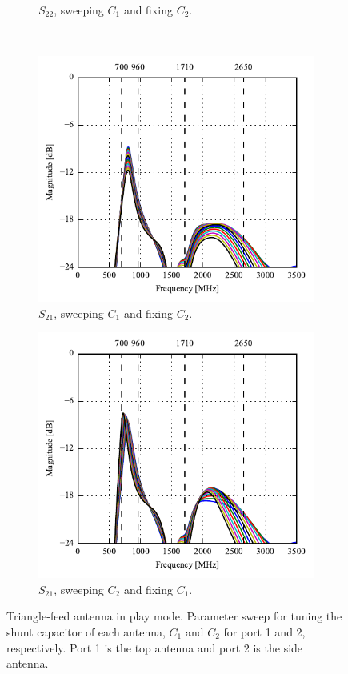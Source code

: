 \begin{figure}[htbp]
\begin{subfigure}[b]{0.49\linewidth}
        \caption{$S_{22}$, sweeping $C_1$ and fixing $C_2$.}
    \end{subfigure}
    \\
    \begin{subfigure}[b]{0.49\linewidth}
        \centering
        \includegraphics{img/tech_sol/trianglefeed/play_mode/Csh1s21.pdf}
        \caption{$S_{21}$, sweeping $C_1$ and fixing $C_2$.}
    \end{subfigure}
    \hfill
    \begin{subfigure}[b]{0.49\linewidth}
        \centering
        \includegraphics{img/tech_sol/trianglefeed/play_mode/Csh2s21.pdf}
        \caption{$S_{21}$, sweeping $C_2$ and fixing $C_1$.}
    \end{subfigure}
    \caption{Triangle-feed antenna in play mode. Parameter sweep for tuning the shunt capacitor of each antenna, $C_1$ and $C_2$ for port 1 and 2, respectively. Port 1 is the top antenna and port 2 is the side antenna.}
    \label{fig:tiang_sparam_sweep_play}
\end{figure}

